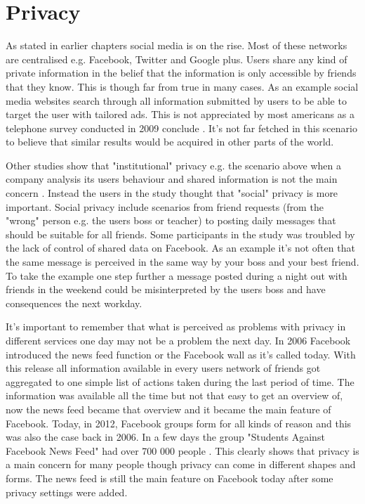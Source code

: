 \section{Privacy}
As stated in earlier chapters social media is on the rise.
Most of these networks are centralised e.g. Facebook, Twitter and Google plus.
Users share any kind of private information in the belief that the information is only accessible by friends that they know.
This is though far from true in many cases.
As an example social media websites search through all information submitted by users to be able to target the user with tailored ads.
This is not appreciated by most americans as a telephone survey conducted in 2009 conclude \cite{turow2009}.
It's not far fetched in this scenario to believe that similar results would be acquired in other parts of the world.

Other studies show that "institutional" privacy e.g. the scenario above when a company analysis its users behaviour and shared information is not the main concern \cite{raynes-goldie2010}.
Instead the users in the study thought that "social" privacy is more important.
Social privacy include scenarios from friend requests (from the "wrong" person e.g. the users boss or teacher) to posting daily messages that should be suitable for all friends.
Some participants in the study was troubled by the lack of control of shared data on Facebook.
As an example it's not often that the same message is perceived in the same way by your boss and your best friend.
To take the example one step further a message posted during a night out with friends in the weekend could be misinterpreted by the users boss and have consequences the next workday.

It's important to remember that what is perceived as problems with privacy in different services one day may not be a problem the next day.
In 2006 Facebook introduced the news feed function or the Facebook wall as it's called today.
With this release all information available in every users network of friends got aggregated to one simple list of actions taken during the last period of time.
The information was available all the time but not that easy to get an overview of, now the news feed became that overview and it became the main feature of Facebook.
Today, in 2012, Facebook groups form for all kinds of reason and this was also the case back in 2006.
In a few days the group "Students Against Facebook News Feed" had over 700 000 people \cite{boyd2008}.
This clearly shows that privacy is a main concern for many people though privacy can come in different shapes and forms.
The news feed is still the main feature on Facebook today after some privacy settings were added.

